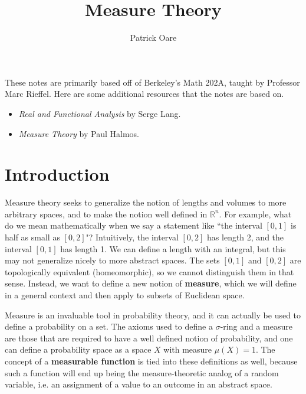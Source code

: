 \def \root {../../}			%


\title{Measure Theory}
\author{Patrick Oare}
\date{}							%


\maketitle

\begin{resources}
These notes are primarily based off of Berkeley's Math 202A, taught by Professor Marc Rieffel. Here are some additional resources that the notes are based on.
\begin{itemize}
	\item \textit{Real and Functional Analysis} by Serge Lang.
	\item \textit{Measure Theory} by Paul Halmos.
\end{itemize}
\end{resources}

\section*{Introduction}

Measure theory seeks to generalize the notion of lengths and volumes to more arbitrary spaces, and to make the notion well defined 
in $\mathbb R^n$. For example, what do we mean mathematically when we say a statement like ``the interval $[0, 1]$ is half as small 
as $[0, 2]$"? Intuitively, the interval $[0, 2]$ has length 2, and the interval $[0, 1]$ has length 1. We can define a length with an 
integral, but this may not generalize nicely to more abstract spaces. The sets $[0, 1]$ and $[0, 2]$ are topologically equivalent 
(homeomorphic), so we cannot distinguish them in that sense. Instead, we want to define a new notion of \textbf{measure}, which we 
will define in a general context and then apply to subsets of Euclidean space.

Measure is an invaluable tool in probability theory, and it can actually be used to define a probability on a set. The axioms used 
to define a $\sigma$-ring and a measure are those that are required to have a well defined notion of probability, and one can 
define a probability space as a space $X$ with measure $\mu(X) = 1$. The concept of a \textbf{measurable function} is tied 
into these definitions as well, because such a function will end up being the measure-theoretic analog of a random variable, i.e. 
an assignment of a value to an outcome in an abstract space.

